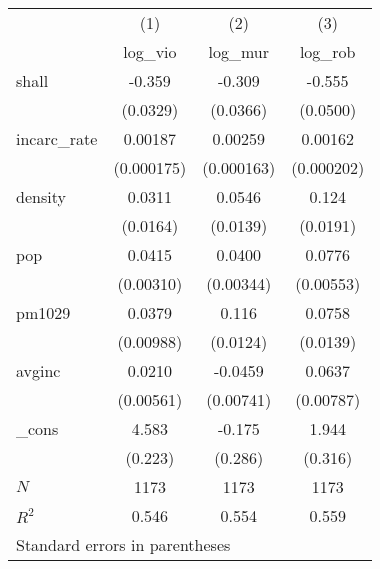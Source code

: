 \begin{tabular}{l*{3}{c}}
\toprule
            &\multicolumn{1}{c}{(1)}&\multicolumn{1}{c}{(2)}&\multicolumn{1}{c}{(3)}\\
            &\multicolumn{1}{c}{log\_vio}&\multicolumn{1}{c}{log\_mur}&\multicolumn{1}{c}{log\_rob}\\
\midrule
shall       &      -0.359&      -0.309&      -0.555\\
            &    (0.0329)&    (0.0366)&    (0.0500)\\
\addlinespace
incarc\_rate &     0.00187&     0.00259&     0.00162\\
            &  (0.000175)&  (0.000163)&  (0.000202)\\
\addlinespace
density     &      0.0311&      0.0546&       0.124\\
            &    (0.0164)&    (0.0139)&    (0.0191)\\
\addlinespace
pop         &      0.0415&      0.0400&      0.0776\\
            &   (0.00310)&   (0.00344)&   (0.00553)\\
\addlinespace
pm1029      &      0.0379&       0.116&      0.0758\\
            &   (0.00988)&    (0.0124)&    (0.0139)\\
\addlinespace
avginc      &      0.0210&     -0.0459&      0.0637\\
            &   (0.00561)&   (0.00741)&   (0.00787)\\
\addlinespace
\_cons      &       4.583&      -0.175&       1.944\\
            &     (0.223)&     (0.286)&     (0.316)\\
\midrule
\(N\)       &        1173&        1173&        1173\\
\(R^{2}\)   &       0.546&       0.554&       0.559\\
\bottomrule
\multicolumn{4}{l}{\footnotesize Standard errors in parentheses}\\
\end{tabular}
